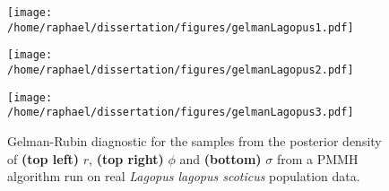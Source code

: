 \documentclass[12pt]{article}
\begin{document}
\begin{appendices}
\clearpage
\thispagestyle{empty}
	\begin{figure}[htb]
		\centering
		\begin{minipage}{0.6\textwidth}
			\centering
			\texttt{[image: /home/raphael/dissertation/figures/gelmanLagopus1.pdf]}
		\end{minipage}
		\begin{minipage}{0.6\textwidth}
			\centering
			\texttt{[image: /home/raphael/dissertation/figures/gelmanLagopus2.pdf]}
		\end{minipage}
		\begin{minipage}{0.6\textwidth}
			\centering
			\texttt{[image: /home/raphael/dissertation/figures/gelmanLagopus3.pdf]}
		\end{minipage}
		\caption[Gelman-Rubin diagnostic of the chains of a PMMH algorithm run on real \emph{Lagopus lagopus scoticus} population data]{Gelman-Rubin diagnostic for the samples from the posterior density of \textbf{(top left)} $r$, \textbf{(top right)} $\phi$ and \textbf{(bottom)} $\sigma$ from a PMMH algorithm run on real \emph{Lagopus lagopus scoticus} population data.}
		\label{fig:gelmanLagopus}
	\end{figure}
\end{appendices}
	
\end{document}
